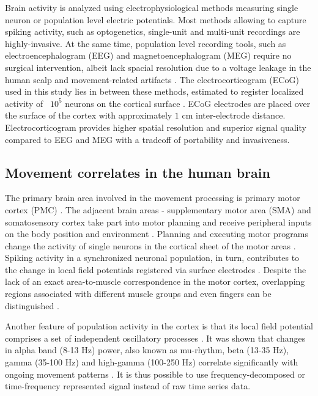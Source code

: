 \documentclass[letterpaper]{article} \usepackage{aaai22}  \usepackage{times}  \usepackage{helvet}  \usepackage{courier}  \usepackage[hyphens]{url}  \usepackage{graphicx} \urlstyle{rm} \def\UrlFont{\rm}  \usepackage{natbib}  \usepackage{caption} \DeclareCaptionStyle{ruled}{labelfont=normalfont,labelsep=colon,strut=off} \frenchspacing  \setlength{\pdfpagewidth}{8.5in}  \setlength{\pdfpageheight}{11in}  \usepackage{algorithm}
\begin{document}
Brain activity is analyzed using electrophysiological methods measuring single neuron or population level electric potentials. Most methods allowing to capture spiking activity, such as optogenetics, single-unit and multi-unit recordings are highly-invasive. At the same time, population level recording tools, such as electroencephalogram (EEG) and magnetoencephalogram (MEG) require no surgical intervention, albeit lack spacial resolution due to a voltage leakage in the human scalp and movement-related artifacts \citep{neilcuffin1979, hamalainen1993, jackson2014}. The electrocorticogram (ECoG) used in this study lies in between these methods, estimated to register localized activity of ~$10^5$ neurons on the cortical surface \citep{engel2005}. ECoG electrodes are placed over the surface of the cortex with approximately $1$ cm inter-electrode distance. Electrocorticogram provides higher spatial resolution and superior signal quality compared to EEG and MEG with a tradeoff of portability and invasiveness.

\subsection*{Movement correlates in the human brain}


The primary brain area involved in the movement processing is primary motor cortex (PMC) \citep{kakei1999}. The adjacent brain areas -  supplementary motor area (SMA) and somatosensory cortex take part into motor planning and receive peripheral inputs on the body position and environment \citep{tam2019}. Planning and executing motor programs change the activity of single neurons in the cortical sheet of the motor areas \citep{kakei1999}. Spiking activity in a synchronized neuronal population, in turn, contributes to the change in local field potentials registered via surface electrodes \citep{buzsaki2012}. Despite the lack of an exact area-to-muscle correspondence in the motor cortex, overlapping regions associated with different muscle groups and even fingers can be distinguished \citep{schieber2001,marjaninejad2017,georgopoulos2015}. 


Another feature of population activity in the cortex is that its local field potential comprises a set of independent oscillatory processes \citep{buzsaki2004}. It was shown that changes in alpha band (8-13 Hz) power, also known as mu-rhythm, beta (13-35 Hz), gamma (35-100 Hz) and high-gamma (100-250 Hz) correlate significantly with ongoing movement patterns \citep{tam2019, marjaninejad2017}. It is thus possible to use frequency-decomposed or time-frequency represented signal instead of raw time series data. 
\end{document}
